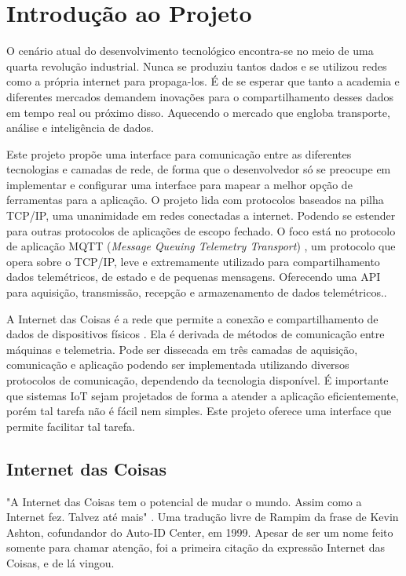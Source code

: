 \chapter{Introdução ao Projeto}
\label{chapter:intro}

O cenário atual do desenvolvimento tecnológico encontra-se no meio de uma quarta revolução industrial. Nunca se produziu tantos dados e se utilizou redes como a própria internet para propaga-los. É de se esperar que tanto a academia e diferentes mercados demandem inovações para o compartilhamento desses dados em tempo real ou próximo disso. Aquecendo o mercado que engloba transporte, análise e inteligência de dados.

Este projeto propõe uma interface para comunicação entre as diferentes tecnologias e camadas de rede, de forma que o desenvolvedor só se preocupe em  implementar e configurar uma interface para mapear a melhor opção de ferramentas para a aplicação. O projeto lida com protocolos baseados na pilha TCP/IP, uma unanimidade em redes conectadas a internet. Podendo se estender para outras protocolos de aplicações de escopo fechado. O foco está no protocolo de aplicação MQTT (\textit{Message Queuing Telemetry Transport}) \cite{mqtt}, um protocolo que opera sobre o TCP/IP, leve e extremamente utilizado para compartilhamento dados telemétricos, de estado e de pequenas mensagens. Oferecendo uma API para aquisição, transmissão, recepção e armazenamento de dados telemétricos..

A Internet das Coisas é a rede que permite a conexão e compartilhamento de dados  de dispositivos físicos . Ela é derivada de métodos de comunicação entre máquinas e telemetria. Pode ser dissecada em três camadas de aquisição, comunicação e aplicação  podendo ser implementada utilizando diversos protocolos de comunicação, dependendo da tecnologia disponível. É importante que sistemas IoT sejam projetados de forma a atender a aplicação eficientemente, porém tal tarefa não é fácil nem simples. Este projeto oferece uma interface que permite facilitar tal tarefa.

\section{Internet das Coisas}
\label{section:iot}

"A Internet das Coisas tem o potencial de mudar o mundo. Assim como a Internet fez. Talvez até mais" \cite{ashton:iot}. Uma tradução livre de Rampim \cite{Rampim:iot} da frase de Kevin Ashton, cofundandor do Auto-ID Center, em 1999. Apesar de ser um nome feito somente para chamar atenção, foi a primeira citação da expressão Internet das Coisas, e de lá vingou.

